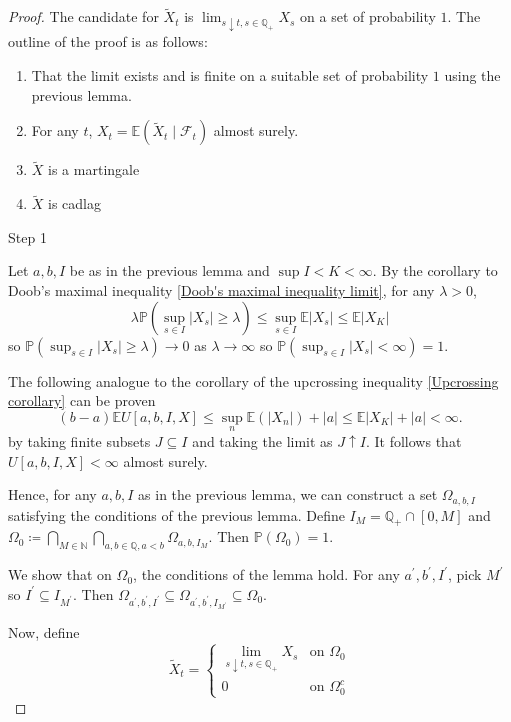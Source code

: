 \documentclass[parskip=full]{article}
\theoremstyle{definition}
\newcommand{\N}{\mathbb{N}}
\newcommand{\Q}{\mathbb{Q}}
\newcommand{\Pbb}{\mathbb{P}}
\newcommand{\1}{\mathbbm{1}}
\newcommand{\E}{\mathbb{E}}
\begin{document}
\begin{proof}
  The candidate for $\tilde{X}_t$ is $\lim_{s \downarrow t, s \in \Q_+} X_s$ on a set of probability $1$. The outline of the proof is as follows:
  \begin{enumerate}
    \item That the limit exists and is finite on a suitable set of probability $1$ using the previous lemma.
    \item For any $t$, $X_t = \E(\tilde{X}_t \mid \mathcal{F}_t)$ almost surely.
    \item $\tilde{X}$ is a martingale
    \item $\tilde{X}$ is cadlag
  \end{enumerate}

Step 1

Let $a, b, I$ be as in the previous lemma and $\sup I < K < \infty$. By the corollary to Doob's maximal inequality \ref{Doob's maximal inequality limit}, for any $\lambda > 0$, 
\[
  \lambda \Pbb(\sup_{s \in I} |X_s| \geq \lambda)\leq \sup_{s \in I} \E |X_s| \leq \E |X_K|
\]
so $\Pbb(\sup_{s \in I} |X_s| \geq \lambda) \to 0$ as $\lambda \to \infty$ so $\Pbb(\sup_{s \in I} |X_s| < \infty) = 1$.

The following analogue to the corollary of the upcrossing inequality \ref{Upcrossing corollary} can be proven
\[
  (b - a) \E U[a, b, I, X] \leq \sup_n \E(|X_n|) + |a| \leq \E |X_K| + |a| < \infty.
\]
by taking finite subsets $J \subseteq I$ and taking the limit as $J \uparrow I$. It follows that $U[a, b, I, X] < \infty$ almost surely.

Hence, for any  $a, b, I$ as in the previous lemma, we can construct a set $\Omega_{a, b, I}$ satisfying the conditions of the previous lemma. Define $I_M = \Q_+ \cap [0, M]$ and $\Omega_0 \coloneqq \bigcap_{M \in \N} \bigcap_{a, b \in \Q, a < b} \Omega_{a, b, I_M}$. Then $\Pbb(\Omega_0) = 1$. 

We show that on $\Omega_0$, the conditions of the lemma hold. For any $a^\prime, b^\prime, I^\prime$, pick $M^\prime$ so $I^\prime \subseteq I_{M^\prime}$. Then $\Omega_{a^\prime, b^\prime, I^\prime} \subseteq \Omega_{a^\prime, b^\prime, I_{M^\prime}} \subseteq \Omega_0$.

Now, define
\[
  \tilde{X}_t = \begin{cases}
    \lim_{s \downarrow t, s \in \Q_+} X_s & \text{on } \Omega_0 \\
    0 & \text{on } \Omega_0^c
  \end{cases}
\]


\end{proof}
\end{document}
